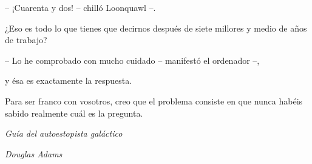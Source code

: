 %
%
%
%
%
%
%
%
%
%
%
%


\ifpdf
\fi

\thispagestyle{empty}\mbox{}

\vspace*{4cm}

\small

\hfill -- ¡Cuarenta y dos! -- chilló Loonquawl --.

\hfill ¿Eso es todo lo que tienes que decirnos después de siete millores y medio de años de trabajo?

\hfill -- Lo he comprobado con mucho cuidado -- manifestó el ordenador --,

\hfill  y ésa es exactamente la respuesta. 

\hfill Para ser franco con vosotros, creo que el problema consiste en que nunca habéis sabido realmente cuál es la pregunta.

\hfill 

\hfill \emph{Guía del autoestopista galáctico}

\hfill \emph{Douglas Adams}


\newpage
\thispagestyle{empty}\mbox{}

\newpage


